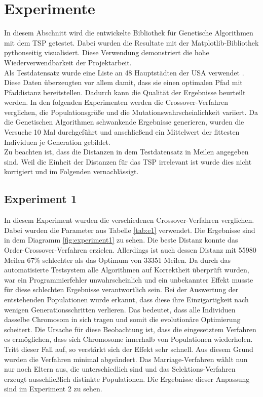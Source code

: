 
\section{Experimente}
In diesem Abschnitt wird die entwickelte Bibliothek für Genetische Algorithmen mit dem TSP getestet. Dabei wurden die Resultate mit der Matplotlib-Bibliothek pythonseitig visualisiert.
Diese Verwendung demonstriert die hohe Wiederverwendbarkeit der Projektarbeit.\\
Als Testdatensatz wurde eine Liste an 48 Hauptstädten der USA verwendet \cite{daten}. Diese Daten überzeugten vor allem damit, dass sie einen optimalen Pfad mit Pfaddistanz bereitstellen. Dadurch kann die Qualität der Ergebnisse beurteilt werden.
In den folgenden Experimenten werden die Crossover-Verfahren verglichen, die Populationsgröße und die Mutationswahrscheinlichkeit variiert. Da die Genetischen Algorithmen schwankende Ergebnisse generieren, wurden die Versuche 10 Mal durchgeführt und anschließend ein Mittelwert der fittesten Individuen je Generation gebildet. \\
Zu beachten ist, dass die Distanzen in dem Testdatensatz in Meilen angegeben sind. Weil die Einheit der Distanzen für das TSP irrelevant ist wurde dies nicht korrigiert und im Folgenden vernachlässigt.

\subsection{Experiment 1}
In diesem Experiment wurden die verschiedenen Crossover-Verfahren verglichen. Dabei wurden die Parameter aus Tabelle \ref{tab:e1} verwendet. Die Ergebnisse sind in dem Diagramm \ref{fig:experiment1} zu sehen. 
Die beste Distanz konnte das Order-Crossover-Verfahren erzielen. Allerdings ist auch dessen Distanz mit 55980 Meilen 67\% schlechter als das Optimum von 33351 Meilen. Da durch das automatisierte Testsystem alle Algorithmen auf Korrektheit überprüft wurden, war ein Programmierfehler unwahrscheinlich und ein unbekannter Effekt musste für diese schlechten Ergebnisse verantwortlich sein. Bei der Auswertung der entstehenden Populationen wurde erkannt, dass diese ihre Einzigartigkeit nach wenigen Generationsschritten verlieren. Das bedeutet, dass alle Individuen dasselbe Chromosom in sich tragen und somit die evolutionäre Optimierung scheitert.
Die Ursache für diese Beobachtung ist, dass die eingesetztem Verfahren es ermöglichen, dass sich Chromosome innerhalb von Populationen wiederholen. Tritt dieser Fall auf, so verstärkt sich der Effekt sehr schnell. Aus diesem Grund wurden die Verfahren minimal abgeändert. Das Marriage-Verfahren wählt nun nur noch Eltern aus, die unterschiedlich sind und das Selektions-Verfahren erzeugt ausschließlich distinkte Populationen. Die Ergebnisse dieser Anpassung sind im Experiment 2 zu sehen.

